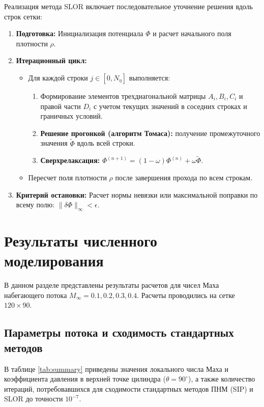 \documentclass[a4paper,12pt]{article}
\begin{document}
	Реализация метода SLOR включает последовательное уточнение решения вдоль строк сетки:
	
	\begin{enumerate}
		\item \textbf{Подготовка:} Инициализация потенциала $\Phi$ и расчет начального поля плотности $\rho$.
		\item \textbf{Итерационный цикл:}
		\begin{itemize}
			\item Для каждой строки $j \in [0, N_\eta]$ выполняется:
			\begin{enumerate}
				\item Формирование элементов трехдиагональной матрицы $A_i, B_i, C_i$ и правой части $D_i$ с учетом текущих значений в соседних строках и граничных условий.
				\item \textbf{Решение прогонкой (алгоритм Томаса):} получение промежуточного значения $\tilde{\Phi}$ вдоль всей строки.
				\item \textbf{Сверхрелаксация:} $\Phi^{(n+1)} = (1 - \omega) \Phi^{(n)} + \omega \tilde{\Phi}$.
			\end{enumerate}
			\item Пересчет поля плотности $\rho$ после завершения прохода по всем строкам.
		\end{itemize}
		\item \textbf{Критерий остановки:} Расчет нормы невязки или максимальной поправки по всему полю: $\|\delta \Phi\|_\infty < \epsilon$.
	\end{enumerate}

	\newpage
	\section{Результаты численного моделирования}

	В данном разделе представлены результаты расчетов для чисел Маха набегающего потока $M_\infty = 0.1, 0.2, 0.3, 0.4$. Расчеты проводились на сетке $120 \times 90$.

	\subsection{Параметры потока и сходимость стандартных методов}

	В таблице \ref{tab:summary} приведены значения локального числа Маха и коэффициента давления в верхней точке цилиндра ($\theta = 90^\circ$), а также количество итераций, потребовавшихся для сходимости стандартных методов ПНМ (SIP) и SLOR до точности $10^{-7}$.
\end{document}
